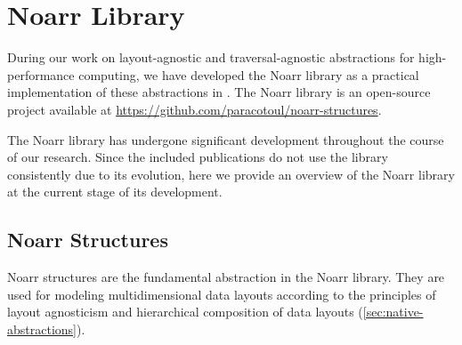 \chapter{Noarr Library}\label{chap:noarr}


During our work on layout-agnostic and traversal-agnostic abstractions for high-performance computing, we have developed the Noarr library as a practical implementation of these abstractions in \cpp. The Noarr library is an open-source project available at \url{https://github.com/paracotoul/noarr-structures}.

The Noarr library has undergone significant development throughout the course of our research. Since the included publications do not use the library consistently due to its evolution, here we provide an overview of the Noarr library at the current stage of its development.

\section{Noarr Structures}\label{sec:noarr-structures}



Noarr structures are the fundamental abstraction in the Noarr library. They are used for modeling multidimensional data layouts according to the principles of layout agnosticism and hierarchical composition of data layouts (\cref{sec:native-abstractions}).


